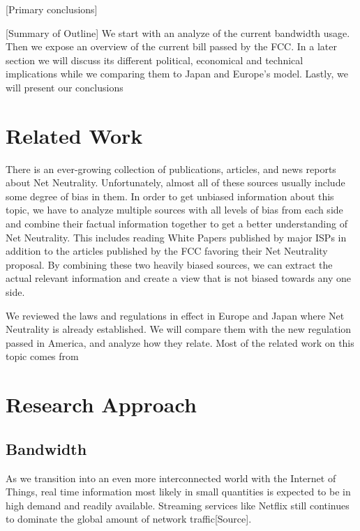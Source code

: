 \documentclass{sigcomm-alternate}
\begin{document}
[Primary conclusions]

[Summary of Outline] We start with an analyze of the current bandwidth usage. Then we expose an overview of the current bill passed by the FCC. In a later section we will discuss its different political, economical and technical implications while we comparing them to Japan and Europe’s model. Lastly, we will present our conclusions


\section{Related Work}
There is an ever-growing collection of publications, articles, and news reports about Net Neutrality. Unfortunately, almost all of these sources usually include some degree of bias in them. In order to get unbiased information about this topic, we have to analyze multiple sources with all levels of bias from each side and combine their factual information together to get a better understanding of Net Neutrality. This includes reading White Papers published by major ISPs in addition to the articles published by the FCC favoring their Net Neutrality proposal. By combining these two heavily biased sources, we can extract the actual relevant information and create a view that is not biased towards any one side.

We reviewed the laws and regulations in effect in Europe and Japan where Net Neutrality is already established. We will compare them with the new regulation passed in America, and analyze how they relate. Most of the related work on this topic comes from


\section{Research Approach}

\subsection{Bandwidth}
As we transition into an even more interconnected world with the Internet of Things, real time information most likely in small quantities is expected to be in high demand and readily available. Streaming services like Netflix still continues to dominate the global amount of network traffic[Source]. 
\end{document}
